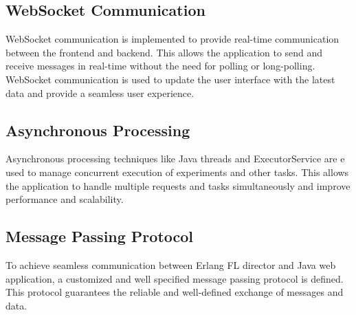 \subsection{WebSocket Communication}
WebSocket communication is implemented to provide real-time communication between the frontend and backend. This allows the application to send and receive messages in real-time without the need for polling or long-polling. WebSocket communication is used to update the user interface with the latest data and provide a seamless user experience.\\

\subsection{Asynchronous Processing}
Asynchronous processing techniques like Java threads and ExecutorService are e used to manage concurrent execution of experiments and other tasks. This allows the application to handle multiple requests and tasks simultaneously and improve performance and scalability.\\

\subsection{Message Passing Protocol}
To achieve seamless communication between Erlang FL director and Java web application, a customized and well specified message passing protocol is defined. This protocol guarantees the reliable and well-defined exchange of messages and data.





